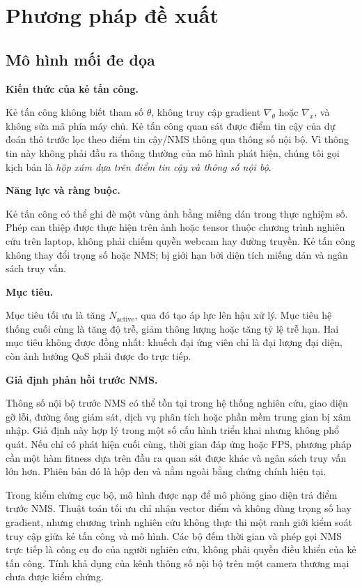 \documentclass[a4paper,fleqn]{cas-dc}
\begin{document}
\section{Phương pháp đề xuất}

\subsection{Mô hình mối đe dọa}

\textbf{Kiến thức của kẻ tấn công.}

Kẻ tấn công không biết tham số $\theta$, không truy cập gradient $\nabla_\theta$ hoặc $\nabla_x$, và không sửa mã phía máy chủ. Kẻ tấn công quan sát được điểm tin cậy của dự đoán thô trước lọc theo điểm tin cậy/NMS thông qua thông số nội bộ. Vì thông tin này không phải đầu ra thông thường của mô hình phát hiện, chúng tôi gọi kịch bản là \emph{hộp xám dựa trên điểm tin cậy và thông số nội bộ}.

\textbf{Năng lực và ràng buộc.}

Kẻ tấn công có thể ghi đè một vùng ảnh bằng miếng dán trong thực nghiệm số. Phép can thiệp được thực hiện trên ảnh hoặc tensor thuộc chương trình nghiên cứu trên laptop, không phải chiếm quyền webcam hay đường truyền. Kẻ tấn công không thay đổi trọng số hoặc NMS; bị giới hạn bởi diện tích miếng dán và ngân sách truy vấn.

\textbf{Mục tiêu.}

Mục tiêu tối ưu là tăng $N_{\mathrm{active}}$, qua đó tạo áp lực lên hậu xử lý. Mục tiêu hệ thống cuối cùng là tăng độ trễ, giảm thông lượng hoặc tăng tỷ lệ trễ hạn. Hai mục tiêu không được đồng nhất: khuếch đại ứng viên chỉ là đại lượng đại diện, còn ảnh hưởng QoS phải được đo trực tiếp.

\textbf{Giả định phản hồi trước NMS.}

Thông số nội bộ trước NMS có thể tồn tại trong hệ thống nghiên cứu, giao diện gỡ lỗi, đường ống giám sát, dịch vụ phân tích hoặc phần mềm trung gian bị xâm nhập. Giả định này hợp lý trong một số cấu hình triển khai nhưng không phổ quát. Nếu chỉ có phát hiện cuối cùng, thời gian đáp ứng hoặc FPS, phương pháp cần một hàm fitness dựa trên đầu ra quan sát được khác và ngân sách truy vấn lớn hơn. Phiên bản đó là hộp đen và nằm ngoài bằng chứng chính hiện tại.

Trong kiểm chứng cục bộ, mô hình được nạp để mô phỏng giao diện trả điểm trước NMS. Thuật toán tối ưu chỉ nhận vector điểm và không dùng trọng số hay gradient, nhưng chương trình nghiên cứu không thực thi một ranh giới kiểm soát truy cập giữa kẻ tấn công và mô hình. Các bộ đếm thời gian và phép gọi NMS trực tiếp là công cụ đo của người nghiên cứu, không phải quyền điều khiển của kẻ tấn công. Tính khả dụng của kênh thông số nội bộ trên một camera thương mại chưa được kiểm chứng.
\end{document}
